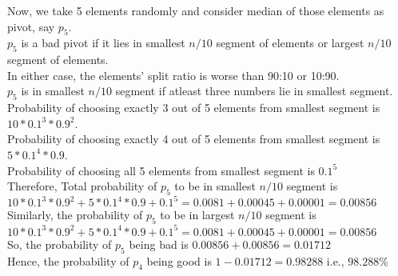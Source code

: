 \documentclass[12pt]{article}
\begin{document}
\begin{enumerate}
\begin{enumerate}
Now, we take 5 elements randomly and consider median of those elements as pivot, say $p_5$.\\
$p_5$ is a bad pivot if it lies in smallest $n/10$ segment of elements or largest $n/10$ segment of elements.\\
In either case, the elements' split ratio is worse than 90:10 or 10:90.\\
$p_5$ is in smallest $n/10$ segment if atleast three numbers lie in smallest segment.\\
Probability of choosing exactly 3 out of 5 elements from smallest segment is $10*0.1^3*0.9^2$.\\
Probability of choosing exactly 4 out of 5 elements from smallest segment is $5*0.1^4*0.9$.\\
Probability of choosing all 5 elements from smallest segment is $0.1^5$\\
Therefore, Total probability of $p_5$ to be in smallest $n/10$ segment is $10*0.1^3*0.9^2 + 5*0.1^4*0.9 + 0.1^5 = 0.0081 + 0.00045 + 0.00001 = 0.00856$\\
Similarly, the probability of $p_5$ to be in largest $n/10$ segment is $10*0.1^3*0.9^2 + 5*0.1^4*0.9 + 0.1^5 = 0.0081 + 0.00045 + 0.00001 = 0.00856$\\
So, the probability of $p_5$ being bad is $0.00856 + 0.00856 = 0.01712$\\
Hence, the probability of $p_4$ being good is $1- 0.01712 = 0.98288$ i.e., $98.288\%$


\end{enumerate}
\end{enumerate}
\end{document}
